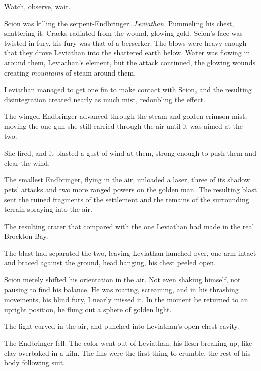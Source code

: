 Watch, observe, wait.



Scion was killing the serpent-Endbringer\ldots \emph{Leviathan}.  Pummeling his chest, shattering it.  Cracks radiated from the wound, glowing gold.  Scion's face was twisted in fury, his fury was that of a berserker.  The blows were heavy enough that they drove Leviathan into the shattered earth below.  Water was flowing in around them, Leviathan's element, but the attack continued, the glowing wounds creating \emph{mountains} of steam around them.



Leviathan managed to get one fin to make contact with Scion, and the resulting disintegration created nearly as much mist, redoubling the effect.



The winged Endbringer advanced through the steam and golden-crimson mist, moving the one gun she still carried through the air until it was aimed at the two.



She fired, and it blasted a gust of wind at them, strong enough to push them and clear the wind.



The smallest Endbringer, flying in the air, unloaded a laser, three of its shadow pets' attacks and two more ranged powers on the golden man.  The resulting blast sent the ruined fragments of the settlement and the remains of the surrounding terrain spraying into the air.



The resulting crater that compared with the one Leviathan had made in the real Brockton Bay.



The blast had separated the two, leaving Leviathan hunched over, one arm intact and braced against the ground, head hanging, his chest peeled open.



Scion merely shifted his orientation in the air.  Not even shaking himself, not pausing to find his balance.  He was roaring, screaming, and in his thrashing movements, his blind fury, I nearly missed it.  In the moment he returned to an upright position, he flung out a sphere of golden light.



The light curved in the air, and punched into Leviathan's open chest cavity.



The Endbringer fell.  The color went out of Leviathan, his flesh breaking up, like clay overbaked in a kiln.  The fins were the first thing to crumble, the rest of his body following suit.



